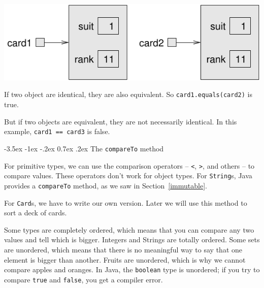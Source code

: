 \documentclass[12pt]{book}
\makeatletter
\theoremstyle{exercise}
\newcommand{\java}[1]{\verb"#1"}
\renewcommand{\section}{\@startsection{section}{1}{\z@}%
    {-3.5ex \@plus -1ex \@minus -.2ex}%
    {0.7ex \@plus.2ex}%
    {\normalfont\Large\bfseries}}
\newcommand{\java}[1]{\lstinline{#1}} %
\makeatother
\begin{document}
\begin{center}
\includegraphics{figs/card.pdf}
\end{center}

If two object are identical, they are also equivalent.
So \java{card1.equals(card2)} is true.

But if two objects are equivalent, they are not necessarily identical.
In this example, \java{card1 == card3} is false. 




\section{The \java{compareTo} method}
\label{compare}


For primitive types, we can use the comparison operators -- \java{<}, \java{>}, and others -- to compare values.
These operators don't work for object types.
For \java{String}s, Java provides a \java{compareTo} method, as we saw in Section~\ref{immutable}.

For \java{Card}s, we have to write our own version.
Later we will use this method to sort a deck of cards.


Some types are completely ordered, which means that you can compare any two values and tell which is bigger.
Integers and Strings are totally ordered.
Some sets are unordered, which means that there is no meaningful way to say that one element is bigger than another.
Fruits are unordered, which is why we cannot compare apples and oranges.
In Java, the \java{boolean} type is unordered; if you try to compare \java{true} and \java{false}, you get a compiler error.
\end{document}
